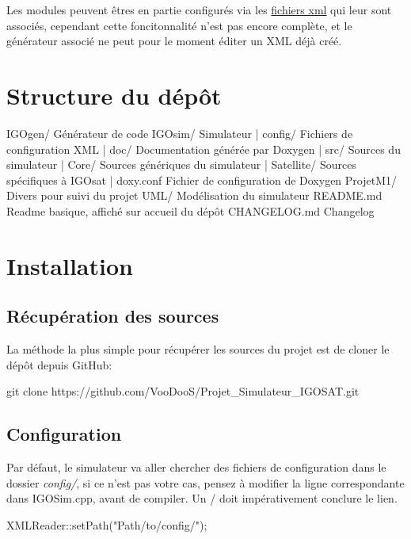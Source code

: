 Les modules peuvent êtres en partie configurés via les \hyperlink{xmlRef}{fichiers xml} qui leur sont associés, cependant cette foncitonnalité n'est pas encore complète, et le générateur associé ne peut pour le moment éditer un X\-M\-L déjà créé.\hypertarget{index_struc}{}\section{Structure du dépôt}\label{index_struc}
\begin{DoxyVerb}IGOgen/                        Générateur de code
IGOsim/                        Simulateur
   | config/                   Fichiers de configuration XML
   | doc/                      Documentation générée par Doxygen
   | src/                      Sources du simulateur
       | Core/                 Sources génériques du simulateur
       | Satellite/            Sources spécifiques à IGOsat
   | doxy.conf                 Fichier de configuration de Doxygen
ProjetM1/                      Divers pour suivi du projet
UML/                           Modélisation du simulateur
README.md                      Readme basique, affiché sur accueil du dépôt
CHANGELOG.md                   Changelog
\end{DoxyVerb}
\hypertarget{index_install_sec}{}\section{Installation}\label{index_install_sec}
\hypertarget{index_tools_subsec}{}\subsection{Récupération des sources}\label{index_tools_subsec}
La méthode la plus simple pour récupérer les sources du projet est de cloner le dépôt depuis Git\-Hub\-: \begin{DoxyVerb}git clone https://github.com/VooDooS/Projet_Simulateur_IGOSAT.git
\end{DoxyVerb}
\hypertarget{index_tools_cofig}{}\subsection{Configuration}\label{index_tools_cofig}
Par défaut, le simulateur va aller chercher des fichiers de configuration dans le dossier {\itshape config/}, si ce n'est pas votre cas, pensez à modifier la ligne correspondante dans I\-G\-O\-Sim.\-cpp, avant de compiler. Un / doit impérativement conclure le lien. \begin{DoxyVerb}XMLReader::setPath("Path/to/config/");
\end{DoxyVerb}

